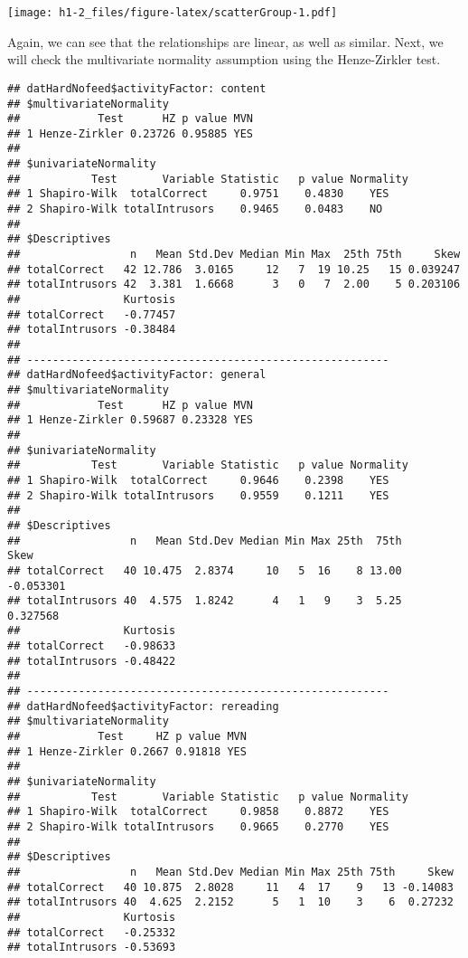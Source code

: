 \documentclass[12pt,]{article}
\begin{document}
\texttt{[image: h1-2\_files/figure-latex/scatterGroup-1.pdf]}

Again, we can see that the relationships are linear, as well as similar.
Next, we will check the multivariate normality assumption using the
Henze-Zirkler test.

\begin{verbatim}
## datHardNofeed$activityFactor: content
## $multivariateNormality
##            Test      HZ p value MVN
## 1 Henze-Zirkler 0.23726 0.95885 YES
## 
## $univariateNormality
##           Test       Variable Statistic   p value Normality
## 1 Shapiro-Wilk  totalCorrect     0.9751    0.4830    YES   
## 2 Shapiro-Wilk totalIntrusors    0.9465    0.0483    NO    
## 
## $Descriptives
##                 n   Mean Std.Dev Median Min Max  25th 75th     Skew
## totalCorrect   42 12.786  3.0165     12   7  19 10.25   15 0.039247
## totalIntrusors 42  3.381  1.6668      3   0   7  2.00    5 0.203106
##                Kurtosis
## totalCorrect   -0.77457
## totalIntrusors -0.38484
## 
## -------------------------------------------------------- 
## datHardNofeed$activityFactor: general
## $multivariateNormality
##            Test      HZ p value MVN
## 1 Henze-Zirkler 0.59687 0.23328 YES
## 
## $univariateNormality
##           Test       Variable Statistic   p value Normality
## 1 Shapiro-Wilk  totalCorrect     0.9646    0.2398    YES   
## 2 Shapiro-Wilk totalIntrusors    0.9559    0.1211    YES   
## 
## $Descriptives
##                 n   Mean Std.Dev Median Min Max 25th  75th      Skew
## totalCorrect   40 10.475  2.8374     10   5  16    8 13.00 -0.053301
## totalIntrusors 40  4.575  1.8242      4   1   9    3  5.25  0.327568
##                Kurtosis
## totalCorrect   -0.98633
## totalIntrusors -0.48422
## 
## -------------------------------------------------------- 
## datHardNofeed$activityFactor: rereading
## $multivariateNormality
##            Test     HZ p value MVN
## 1 Henze-Zirkler 0.2667 0.91818 YES
## 
## $univariateNormality
##           Test       Variable Statistic   p value Normality
## 1 Shapiro-Wilk  totalCorrect     0.9858    0.8872    YES   
## 2 Shapiro-Wilk totalIntrusors    0.9665    0.2770    YES   
## 
## $Descriptives
##                 n   Mean Std.Dev Median Min Max 25th 75th     Skew
## totalCorrect   40 10.875  2.8028     11   4  17    9   13 -0.14083
## totalIntrusors 40  4.625  2.2152      5   1  10    3    6  0.27232
##                Kurtosis
## totalCorrect   -0.25332
## totalIntrusors -0.53693
\end{verbatim}
\end{document}
